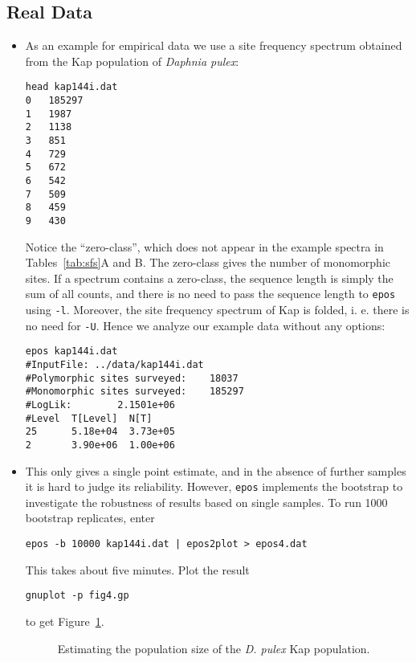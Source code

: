 \documentclass[a4paper]{article}
\newcommand{\ty}{\texttt}
\begin{document}
\subsection{Real Data}
\begin{itemize}
\item As an example for empirical data we use a site frequency spectrum obtained from
  the Kap population of \textit{Daphnia pulex}:
\begin{verbatim}
head kap144i.dat 
0	185297
1	1987
2	1138
3	851
4	729
5	672
6	542
7	509
8	459
9	430
\end{verbatim}
Notice the ``zero-class'', which does not appear in the
example spectra in Tables~\ref{tab:sfs}A and B. The zero-class gives
the number of monomorphic sites. If a spectrum contains a zero-class,
the sequence length is simply the sum of all counts, and there is no need
to pass the sequence length to \ty{epos} using \ty{-l}. Moreover, the
site frequency spectrum of Kap is folded, i. e. there is no need for \ty{-U}. Hence
we analyze our example data without any options:
\begin{verbatim}
epos kap144i.dat
#InputFile:	../data/kap144i.dat
#Polymorphic sites surveyed:	18037
#Monomorphic sites surveyed:	185297
#LogLik:		2.1501e+06
#Level  T[Level]  N[T]
25      5.18e+04  3.73e+05
2       3.90e+06  1.00e+06
\end{verbatim}
\item This only gives a single point estimate, and in the absence of
  further samples it is hard to judge its reliability. However,
  \ty{epos} implements the bootstrap to investigate the robustness of
  results based on single samples. To run 1000 bootstrap replicates, enter
\begin{verbatim}
epos -b 10000 kap144i.dat | epos2plot > epos4.dat
\end{verbatim}
This takes about five minutes. Plot the result
\begin{verbatim}
gnuplot -p fig4.gp
\end{verbatim}
to get Figure~\ref{fig:kap}.
\begin{figure}
  \begin{center}
    \scalebox{0.6}{}
  \end{center}
  \caption{Estimating the population size of the \textit{D. pulex} Kap
    population.}\label{fig:kap}
\end{figure}
\end{itemize}
\end{document}
